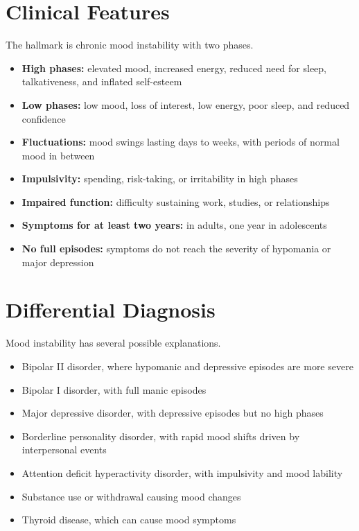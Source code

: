 \section*{Clinical Features}
The hallmark is chronic mood instability with two phases.

\begin{itemize}
    \item \textbf{High phases:} elevated mood, increased energy, reduced need for sleep, talkativeness, and inflated self-esteem
    \item \textbf{Low phases:} low mood, loss of interest, low energy, poor sleep, and reduced confidence
    \item \textbf{Fluctuations:} mood swings lasting days to weeks, with periods of normal mood in between
    \item \textbf{Impulsivity:} spending, risk-taking, or irritability in high phases
    \item \textbf{Impaired function:} difficulty sustaining work, studies, or relationships
    \item \textbf{Symptoms for at least two years:} in adults, one year in adolescents
    \item \textbf{No full episodes:} symptoms do not reach the severity of hypomania or major depression
\end{itemize}

\section*{Differential Diagnosis}
Mood instability has several possible explanations.

\begin{itemize}
    \item Bipolar II disorder, where hypomanic and depressive episodes are more severe
    \item Bipolar I disorder, with full manic episodes
    \item Major depressive disorder, with depressive episodes but no high phases
    \item Borderline personality disorder, with rapid mood shifts driven by interpersonal events
    \item Attention deficit hyperactivity disorder, with impulsivity and mood lability
    \item Substance use or withdrawal causing mood changes
    \item Thyroid disease, which can cause mood symptoms
\end{itemize}

